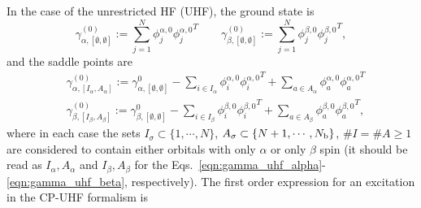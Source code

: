 \documentclass[11pt]{article}
\begin{document}
In the case of the unrestricted HF (UHF), the ground state is
\begin{equation}
\gamma_{\alpha,[\emptyset,\emptyset]}^{(0)} := \sum_{j=1}^N \phi_j^{\alpha,0} {\phi_j^{\alpha,0}}^T\qquad \gamma_{\beta,[\emptyset,\emptyset]}^{(0)} := \sum_{j=1}^N \phi_j^{\beta,0} {\phi_j^{\beta,0}}^T,
\end{equation}
and the saddle points are%
\begin{align}
 &\gamma_{\alpha,[I_\alpha,A_\alpha]}^{(0)} := \gamma_{\alpha,[\emptyset,\emptyset]}^{0} - \sum_{i \in I_\alpha} \phi_i^{\alpha,0}{\phi_i^{\alpha,0}}^T + \sum_{a \in A_\alpha} \phi_a^{\alpha,0}{\phi_a^{\alpha,0}}^T \label{eqn:gamma_uhf_alpha}\\
 &\gamma_{\beta,[I_\beta,A_\beta]}^{(0)} := \gamma_{\beta,[\emptyset,\emptyset]}^{0} - \sum_{i \in I_\beta} \phi_i^{\beta,0}{\phi_i^{\beta,0}}^T + \sum_{a \in A_\beta} \phi_a^{\beta,0}{\phi_a^{\beta,0}}^T, 
 \label{eqn:gamma_uhf_beta}
\end{align}
where in each case the sets $I_\sigma \subset \{1,\cdots,N\}$, $A_\sigma \subset \{N+1,\cdots,N_{\rm b}\}$, $\#I=\#A \ge 1$ are considered to contain either orbitals with only $\alpha$ or only $\beta$ spin (it should be read as $I_\alpha, A_\alpha$ and $I_\beta, A_\beta$ for the Eqs.~\ref{eqn:gamma_uhf_alpha}-\ref{eqn:gamma_uhf_beta}, respectively). 
The first order expression for an excitation in the CP-UHF formalism is
\end{document}
